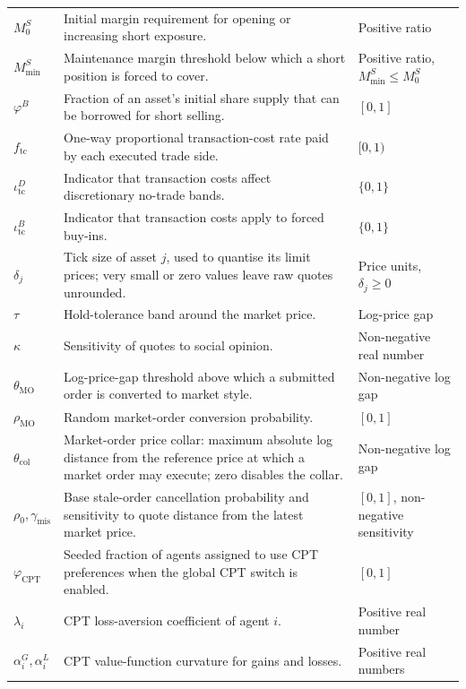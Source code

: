 \documentclass[12pt, a4paper]{article}
\begin{document}
\begin{longtable}{@{}L{0.22\textwidth}L{0.50\textwidth}L{0.20\textwidth}@{}}
        \(M_0^{S}\) & Initial margin requirement for opening or increasing short exposure. & Positive ratio \\
        \(M_{\min}^{S}\) & Maintenance margin threshold below which a short position is forced to cover. & Positive ratio, \(M_{\min}^{S}\le M_0^{S}\) \\
        \(\varphi^{B}\) & Fraction of an asset's initial share supply that can be borrowed for short selling. & \([0,1]\) \\
        \(f_{\mathrm{tc}}\) & One-way proportional transaction-cost rate paid by each executed trade side. & \([0,1)\) \\
        \(\iota_{\mathrm{tc}}^D\) & Indicator that transaction costs affect discretionary no-trade bands. & \(\{0,1\}\) \\
        \(\iota_{\mathrm{tc}}^B\) & Indicator that transaction costs apply to forced buy-ins. & \(\{0,1\}\) \\
        \(\delta_j\) & Tick size of asset \(j\), used to quantise its limit prices; very small or zero values leave raw quotes unrounded. & Price units, \(\delta_j\ge0\) \\
        \(\tau\) & Hold-tolerance band around the market price. & Log-price gap \\
        \(\kappa\) & Sensitivity of quotes to social opinion. & Non-negative real number \\
        \(\theta_{\mathrm{MO}}\) & Log-price-gap threshold above which a submitted order is converted to market style. & Non-negative log gap \\
        \(\rho_{\mathrm{MO}}\) & Random market-order conversion probability. & \([0,1]\) \\
        \(\theta_{\mathrm{col}}\) & Market-order price collar: maximum absolute log distance from the reference price at which a market order may execute; zero disables the collar. & Non-negative log gap \\
        \(\rho_0,\gamma_{\mathrm{mis}}\) & Base stale-order cancellation probability and sensitivity to quote distance from the latest market price. & \([0,1]\), non-negative sensitivity \\
        \(\varphi_{\mathrm{CPT}}\) & Seeded fraction of agents assigned to use CPT preferences when the global CPT switch is enabled. & \([0,1]\) \\
        \(\lambda_i\) & CPT loss-aversion coefficient of agent \(i\). & Positive real number \\
        \(\alpha_i^G,\alpha_i^L\) & CPT value-function curvature for gains and losses. & Positive real numbers \\

\end{longtable}
\end{document}
